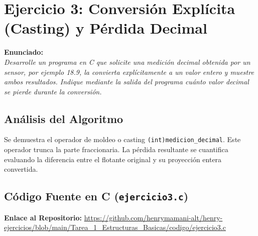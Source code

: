 \documentclass[12pt]{article}
\begin{document}
\section*{Ejercicio 3: Conversión Explícita (Casting) y Pérdida Decimal}

\noindent\textbf{Enunciado:}\\
\textit{Desarrolle un programa en C que solicite una medición decimal obtenida por un sensor, por ejemplo 18.9, la convierta explícitamente a un valor entero y muestre ambos resultados. Indique mediante la salida del programa cuánto valor decimal se pierde durante la conversión.}

\subsection*{Análisis del Algoritmo}
Se demuestra el operador de moldeo o casting \texttt{(int)medicion\_decimal}. Este operador trunca la parte fraccionaria. La pérdida resultante se cuantifica evaluando la diferencia entre el flotante original y su proyección entera convertida.

\subsection*{Código Fuente en C (\texttt{ejercicio3.c})}
\noindent\textbf{Enlace al Repositorio:} \url{https://github.com/henrymamani-alt/henry-ejercicios/blob/main/Tarea_1_Estructuras_Basicas/codigo/ejercicio3.c}
\end{document}
